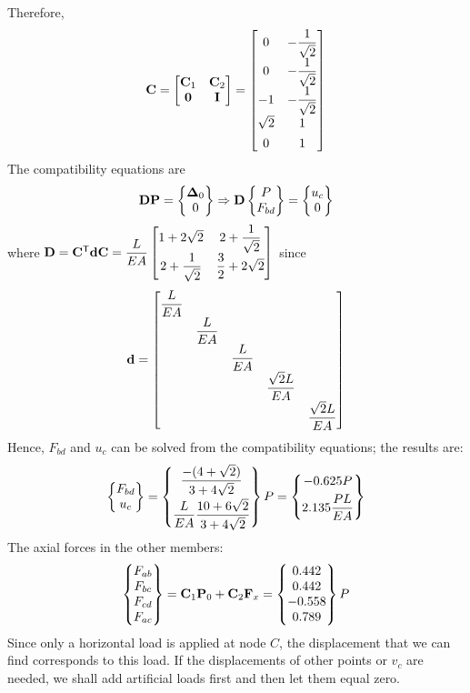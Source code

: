 \begin{example}[Truss]
Therefore,
\begin{equation*}
  \mathbf{C} = \begin{bmatrix}\mathbf{C}_1 & \mathbf{C}_2\\ \mathbf{0} & \mathbf{I}\end{bmatrix} =
  \begin{bmatrix}
    0 & -\dfrac{1}{\sqrt2}\\[6pt] 0 & -\dfrac{1}{\sqrt2}\\[6pt] -1 & -\dfrac{1}{\sqrt2}\\[6pt] \sqrt2 & 1\\[4pt] 0 & 1
  \end{bmatrix}
\end{equation*}
The compatibility equations are
\begin{equation*}
  \mathbf{D}\mathbf{P} = \begin{Bmatrix}\bm{\Delta}_0\\ 0\end{Bmatrix} \Rightarrow \mathbf{D}\begin{Bmatrix}P\\ F_{bd}\end{Bmatrix} = \begin{Bmatrix}u_c\\ 0\end{Bmatrix}
\end{equation*}
where $\mathbf{D} = \mathbf{C}^{\mathsf{T}}\mathbf{d}\mathbf{C} = \dfrac{L}{EA}\begin{bmatrix}1+2\sqrt2 & 2+\dfrac{1}{\sqrt2}\\[6pt] 2+\dfrac{1}{\sqrt2} & \dfrac32+2\sqrt2\end{bmatrix}$ since
\begin{equation*}
  \mathbf{d} = \begin{bmatrix}
    \dfrac{L}{EA} & & & & \\[4pt] & \dfrac{L}{EA} & & & \\[4pt] & & \dfrac{L}{EA} & & \\[4pt] & & & \dfrac{\sqrt2L}{EA} & \\[4pt] & & & & \dfrac{\sqrt2L}{EA}
  \end{bmatrix}
\end{equation*}
Hence, $F_{bd}$ and $u_c$ can be solved from the compatibility equations; the results are:
\begin{equation*}
  \begin{Bmatrix}F_{bd}\\ u_c\end{Bmatrix} = \begin{Bmatrix}\dfrac{-(4+\sqrt2)}{3+4\sqrt2}\\[8pt] \dfrac{L}{EA}\dfrac{10+6\sqrt2}{3+4\sqrt2}\end{Bmatrix}P = \begin{Bmatrix}-0.625P\\[4pt] 2.135\dfrac{PL}{EA}\end{Bmatrix}
\end{equation*}
The axial forces in the other members:
\begin{equation*}
  \begin{Bmatrix}F_{ab}\\ F_{bc}\\ F_{cd}\\ F_{ac}\end{Bmatrix} = \mathbf{C}_1\mathbf{P}_0 + \mathbf{C}_2\mathbf{F}_x = \begin{Bmatrix}0.442\\ 0.442\\ -0.558\\ 0.789\end{Bmatrix}P
\end{equation*}
Since only a horizontal load is applied at node $C$, the displacement that we can find corresponds to this load. If the displacements of other points or $v_c$ are needed, we shall add artificial loads first and then let them equal zero.
\end{example}

